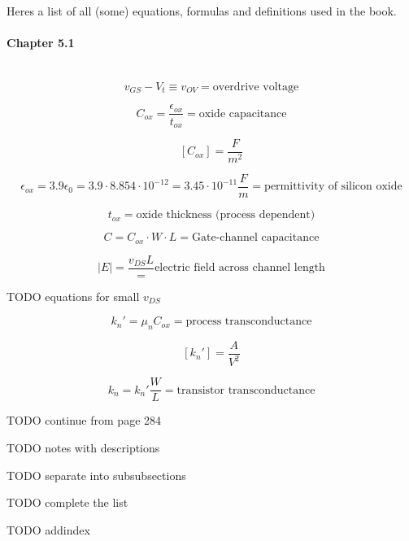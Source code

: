 Heres a list of all (some) equations, formulas and definitions used in
the book.

\paragraph{Chapter 5.1} \hfill \
$$v_{GS} - V_t \equiv v_{OV} = \text{overdrive voltage}$$

$$C_{ox} = \frac{\epsilon_{ox}}{t_{ox}} = \text{oxide capacitance}$$

$$[C_{ox}] = \frac{F}{m^2}$$

$$\epsilon_{ox} = 3.9\epsilon_0 = 3.9\cdot 8.854\cdot 10^{-12}
  = 3.45\cdot 10^{-11} \frac{F}{m} = \text{permittivity of silicon oxide}$$

$$t_{ox} = \text{oxide thickness (process dependent)}$$

$$C = C_{ox}\cdot W\cdot L = \text{Gate-channel capacitance}$$

$$|E| = \frac{v_{DS}{L}} = \text{electric field across channel length}$$

TODO equations for small $v_{DS}$

$$k_n' = \mu_n C_{ox} = \text{process transconductance}$$

$$[k_n'] = \frac{A}{V^2}$$

$$k_n = k_n' \frac{W}{L} = \text{transistor transconductance}$$

TODO continue from page 284

TODO notes with descriptions

TODO separate into subsubsections

TODO complete the list

TODO addindex
